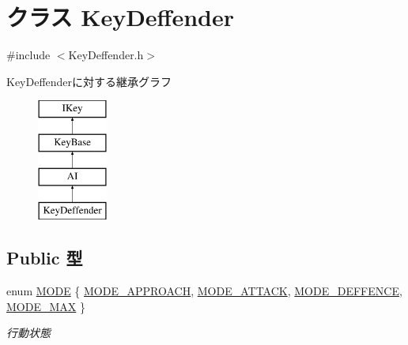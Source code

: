 \hypertarget{class_key_deffender}{\section{クラス Key\-Deffender}
\label{class_key_deffender}
}


{\ttfamily \#include $<$Key\-Deffender.\-h$>$}

Key\-Deffenderに対する継承グラフ\begin{figure}[H]
\begin{center}
\leavevmode
\includegraphics[height=4.000000cm]{d5/dfd/class_key_deffender}
\end{center}
\end{figure}
\subsection*{Public 型}
{\bf }\par
\begin{DoxyCompactItemize}
\item 
enum \hyperlink{class_key_deffender_a2d0fa24da9c8801e29e09785e96532c5}{M\-O\-D\-E} \{ \hyperlink{class_key_deffender_a2d0fa24da9c8801e29e09785e96532c5abf68816f1b29a89fb4cfba57726bf02f}{M\-O\-D\-E\-\_\-\-A\-P\-P\-R\-O\-A\-C\-H}, 
\hyperlink{class_key_deffender_a2d0fa24da9c8801e29e09785e96532c5a9864b335ebddb53f54ee6d6fc376e305}{M\-O\-D\-E\-\_\-\-A\-T\-T\-A\-C\-K}, 
\hyperlink{class_key_deffender_a2d0fa24da9c8801e29e09785e96532c5a4bed2e2b8eb7c720589155ea020474ee}{M\-O\-D\-E\-\_\-\-D\-E\-F\-F\-E\-N\-C\-E}, 
\hyperlink{class_key_deffender_a2d0fa24da9c8801e29e09785e96532c5ac6a457d66150ab005b17c5162818451a}{M\-O\-D\-E\-\_\-\-M\-A\-X}
 \}
\begin{DoxyCompactList}\small\item\em 行動状態 \end{DoxyCompactList}\end{DoxyCompactItemize}

